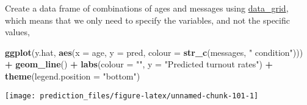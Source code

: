 \documentclass[]{book}
\newenvironment{Shaded}{\begin{snugshade}}{\end{snugshade}}
\newcommand{\DataTypeTok}[1]{\textcolor[rgb]{0.13,0.29,0.53}{#1}}
\newcommand{\DecValTok}[1]{\textcolor[rgb]{0.00,0.00,0.81}{#1}}
\newcommand{\FloatTok}[1]{\textcolor[rgb]{0.00,0.00,0.81}{#1}}
\newcommand{\KeywordTok}[1]{\textcolor[rgb]{0.13,0.29,0.53}{\textbf{#1}}}
\newcommand{\NormalTok}[1]{#1}
\newcommand{\OperatorTok}[1]{\textcolor[rgb]{0.81,0.36,0.00}{\textbf{#1}}}
\newcommand{\StringTok}[1]{\textcolor[rgb]{0.31,0.60,0.02}{#1}}
\theoremstyle{definition}
\theoremstyle{definition}
\theoremstyle{definition}
\theoremstyle{remark}
\begin{document}
Create a data frame of combinations of ages and messages using
\href{https://www.rdocumentation.org/packages/modelr/topics/data_grid}{data\_grid},
which means that we only need to specify the variables, and not the
specific values,

\begin{Shaded}
\end{Shaded}

\begin{Shaded}
\begin{Highlighting}[]
\KeywordTok{ggplot}\NormalTok{(y.hat, }\KeywordTok{aes}\NormalTok{(}\DataTypeTok{x =}\NormalTok{ age, }\DataTypeTok{y =}\NormalTok{ pred,}
                  \DataTypeTok{colour =} \KeywordTok{str_c}\NormalTok{(messages, }\StringTok{" condition"}\NormalTok{))) }\OperatorTok{+}
\StringTok{  }\KeywordTok{geom_line}\NormalTok{() }\OperatorTok{+}
\StringTok{  }\KeywordTok{labs}\NormalTok{(}\DataTypeTok{colour =} \StringTok{""}\NormalTok{, }\DataTypeTok{y =} \StringTok{"Predicted turnout rates"}\NormalTok{) }\OperatorTok{+}
\StringTok{  }\KeywordTok{theme}\NormalTok{(}\DataTypeTok{legend.position =} \StringTok{"bottom"}\NormalTok{)}
\end{Highlighting}
\end{Shaded}

\begin{center}\texttt{[image: prediction\_files/figure-latex/unnamed-chunk-101-1]} \end{center}

\begin{Shaded}
\end{Shaded}
\end{document}
